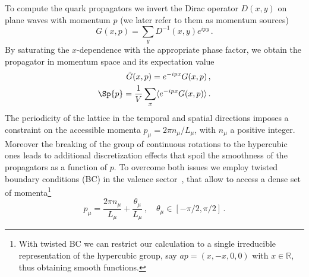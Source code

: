 \documentclass[aps,prd,twocolumn,nofootinbib,showpacs,superscriptaddress]{revtex4-1}
\begin{document}
To compute the quark propagators we invert the Dirac operator $D(x,y)$ on plane 
waves with momentum $p$ (we later refer to them as momentum sources)
\begin{equation}
G(x,p) = \sum_y D^{-1}(x,y) e^{ipy} \,.
\label{eq:Gxp}
\end{equation}
By saturating the $x$-dependence with the appropriate 
phase factor, we obtain the propagator in momentum space and
its expectation value
\begin{align}
\tilde G(x,p) = e^{-ipx} G(x,p) \,, \\
\Sp{p} = \frac{1}{V} \sum_x \langle e^{-ipx} G(x,p) \rangle \,.
\label{eq:props}
\end{align}
The periodicity of the lattice in the temporal and spatial directions
imposes a constraint on the accessible momenta $p_\mu = 2 \pi n_\mu / L_\mu$,
with $n_\mu$ a positive integer. Moreover the breaking of the group
of continuous rotations to the hypercubic ones leads to additional discretization
effects that spoil the smoothness of the propagators as a function of $p$.
To overcome both issues we employ twisted boundary conditions (BC) 
in the valence sector~\cite{deDivitiis:2004kq,Boyle:2003ui,Arthur:2010ht}, 
that allow to access a dense set of momenta\footnote{
With twisted BC we can restrict our calculation to a single irreducible representation
of the hypercubic group, say $ap=(x,-x,0,0)$ with $x \in \mathbb{R}$,
thus obtaining smooth functions.}
\begin{equation}
p_\mu = \frac{2 \pi n_\mu }{L_\mu} + \frac{\theta_\mu}{L_\mu} \,, \quad \theta_\mu \in [-\pi/2, \pi/2] \,.
\label{eq:twistedBC}
\end{equation}
\end{document}
